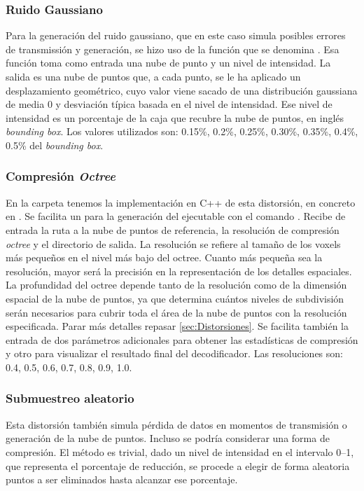 \subsubsection{Ruido Gaussiano} 
Para la generación del ruido gaussiano, que en este caso simula posibles 
errores de transmissión y generación, se hizo uso de la función que se denomina
. 
Esa función toma como entrada 
una nube de punto y un nivel de intensidad. La salida es una nube de puntos que, 
a cada punto, se le ha aplicado un desplazamiento geométrico, cuyo valor 
viene sacado de una distribución gaussiana de media 0 y desviación típica 
basada en el nivel de intensidad. Ese nivel de intensidad es un porcentaje 
de la caja que recubre la nube de puntos, en inglés \emph{bounding box}.
Los valores utilizados son: 0.15\%, 0.2\%, 0.25\%, 0.30\%, 0.35\%, 0.4\%, 0.5\%
del \emph{bounding box}.
\subsubsection{Compresión \emph{Octree}}
En la carpeta  tenemos la implementación en C++ de esta 
distorsión, en concreto en . Se facilita 
un  para la generación del ejecutable con el comando 
. Recibe de entrada la ruta a la nube de puntos de referencia, 
la resolución de compresión \emph{octree} y el directorio de salida. 
La resolución se refiere al tamaño de los voxels más pequeños en el nivel más 
bajo del octree. Cuanto más pequeña sea la resolución, mayor será la precisión 
en la representación de los detalles espaciales. 
La profundidad del octree depende tanto de la resolución como de la dimensión 
espacial de la nube de puntos, ya que determina cuántos niveles de subdivisión 
serán necesarios para cubrir toda el área de la nube de puntos con la resolución 
especificada. Parar más detalles repasar \ref{sec:Distorsiones}. 
Se facilita también la entrada de dos parámetros adicionales para obtener 
las estadísticas de compresión y otro para visualizar el resultado final del 
decodificador. Las resoluciones son: 0.4, 0.5, 0.6, 0.7, 0.8, 0.9, 1.0.
\subsubsection{Submuestreo aleatorio}
Esta distorsión también simula pérdida de datos en momentos de transmisión o 
generación de la nube de puntos. Incluso se podría considerar una forma de 
compresión. El método es trivial, dado un nivel de intensidad en el intervalo 
0--1, que representa el porcentaje de reducción, se procede a elegir de forma 
aleatoria puntos a ser eliminados hasta alcanzar ese porcentaje.  

